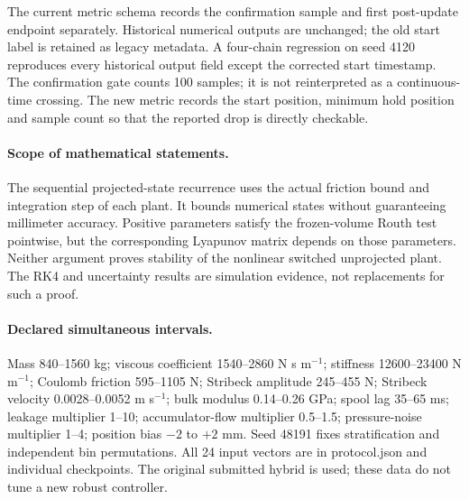 The current metric schema records the confirmation sample and first post-update endpoint separately. Historical numerical outputs are unchanged; the old start label is retained as legacy metadata. A four-chain regression on seed 4120 reproduces every historical output field except the corrected start timestamp. The confirmation gate counts 100 samples; it is not reinterpreted as a continuous-time crossing. The new metric records the start position, minimum hold position and sample count so that the reported drop is directly checkable.

\paragraph{Scope of mathematical statements.} The sequential projected-state recurrence uses the actual friction bound and integration step of each plant. It bounds numerical states without guaranteeing millimeter accuracy. Positive parameters satisfy the frozen-volume Routh test pointwise, but the corresponding Lyapunov matrix depends on those parameters. Neither argument proves stability of the nonlinear switched unprojected plant. The RK4 and uncertainty results are simulation evidence, not replacements for such a proof.

\paragraph{Declared simultaneous intervals.} Mass 840--1560 kg; viscous coefficient 1540--2860 N s m$^{-1}$; stiffness 12600--23400 N m$^{-1}$; Coulomb friction 595--1105 N; Stribeck amplitude 245--455 N; Stribeck velocity 0.0028--0.0052 m s$^{-1}$; bulk modulus 0.14--0.26 GPa; spool lag 35--65 ms; leakage multiplier 1--10; accumulator-flow multiplier 0.5--1.5; pressure-noise multiplier 1--4; position bias $-2$ to $+2$ mm. Seed 48191 fixes stratification and independent bin permutations. All 24 input vectors are in protocol.json and individual checkpoints. The original submitted hybrid is used; these data do not tune a new robust controller.

